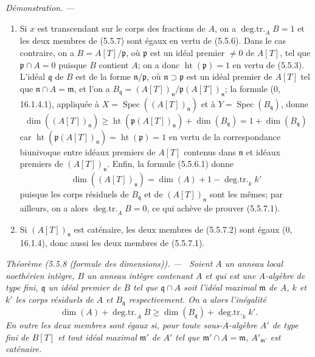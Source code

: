 \documentclass[10pt,oneside]{book}
\newenvironment{theorem}[1][]{%
  \par\medskip\noindent\itshape Théorème (#1). ---\ }{\par}
\newenvironment{proof}{%
  \par\medskip\noindent\textit{Démonstration. ---\ }}{\par}
\begin{document}
\begin{proof}
\begin{enumerate}
\item[(i)] Si $x$ est transcendant sur le corps des fractions de $A$, on a
$\operatorname{deg.tr.}_A B=1$ et les deux membres de (5.5.7) sont égaux en
vertu de (5.5.6). Dans le cas contraire, on a $B=A[T]/\mathfrak p$, où
$\mathfrak p$ est un idéal premier $\ne0$ de $A[T]$, tel que
$\mathfrak p\cap A=0$ puisque $B$ contient $A$; on a donc
$\operatorname{ht}(\mathfrak p)=1$ en vertu de (5.5.3). L'idéal
$\mathfrak q$ de $B$ est de la forme $\mathfrak n/\mathfrak p$, où
$\mathfrak n\supset\mathfrak p$ est un idéal premier de $A[T]$ tel que
$\mathfrak n\cap A=\mathfrak m$, et l'on a
$B_{\mathfrak q}=(A[T])_{\mathfrak n}/\mathfrak p(A[T])_{\mathfrak n}$;
la formule (0, 16.1.4.1), appliquée à
$X=\operatorname{Spec}((A[T])_{\mathfrak n})$ et à
$Y=\operatorname{Spec}(B_{\mathfrak q})$, donne
\begin{equation}
\dim((A[T])_{\mathfrak n})
\geq\operatorname{ht}(\mathfrak p(A[T])_{\mathfrak n})
+\dim(B_{\mathfrak q})=1+\dim(B_{\mathfrak q})
\tag{5.5.7.2}\label{IV.2.s5.5.7.2-fr}
\end{equation}
car $\operatorname{ht}(\mathfrak p(A[T])_{\mathfrak n})
=\operatorname{ht}(\mathfrak p)=1$ en vertu de la correspondance biunivoque
entre idéaux premiers de $A[T]$ contenus dans $\mathfrak n$ et idéaux
premiers de $(A[T])_{\mathfrak n}$. Enfin, la formule (5.5.6.1) donne
\begin{equation}
\dim((A[T])_{\mathfrak n})
=\dim(A)+1-\operatorname{deg.tr.}_k k'
\tag{5.5.7.3}\label{IV.2.s5.5.7.3-fr}
\end{equation}
puisque les corps résiduels de $B_{\mathfrak q}$ et de
$(A[T])_{\mathfrak n}$ sont les mêmes; par ailleurs, on a alors
$\operatorname{deg.tr.}_A B=0$, ce qui achève de prouver (5.5.7.1).
\item[(ii)] Si $(A[T])_{\mathfrak n}$ est caténaire, les deux membres de
(5.5.7.2) sont égaux (0, 16.1.4), donc aussi les deux membres de (5.5.7.1).
\end{enumerate}
\end{proof}

\begin{theorem}[5.5.8 (formule des dimensions)]
\label{IV.2.s5.5.8-fr}
Soient $A$ un anneau local noethérien intègre, $B$ un anneau intègre contenant
$A$ et qui est une $A$-algèbre de type fini, $\mathfrak q$ un idéal premier
de $B$ tel que $\mathfrak q\cap A$ soit l'idéal maximal $\mathfrak m$ de
$A$, $k$ et $k'$ les corps résiduels de $A$ et $B_{\mathfrak q}$
respectivement. On a alors l'inégalité
\begin{equation}
\dim(A)+\operatorname{deg.tr.}_A B
\geq\dim(B_{\mathfrak q})+\operatorname{deg.tr.}_k k'.
\tag{5.5.8.1}\label{IV.2.s5.5.8.1-fr}
\end{equation}
En outre les deux membres sont égaux si, pour toute sous-$A$-algèbre $A'$ de
type fini de $B[T]$ et tout idéal maximal $\mathfrak m'$ de $A'$ tel que
$\mathfrak m'\cap A=\mathfrak m$, $A'_{\mathfrak m'}$ est caténaire.
\end{theorem}
\end{document}
